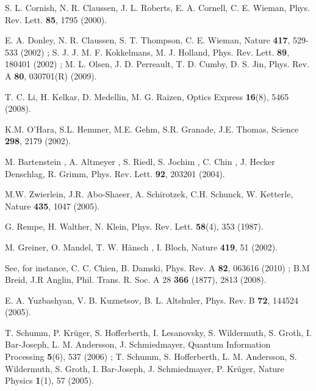 \documentclass[aps,pra,floats,epsfig,pdflatex]{revtex4}                                                              %
\begin{document}
\begin{thebibliography}{}
S. L. Cornish, N. R. Claussen, J. L. Roberts, E. A. Cornell, C. E. Wieman, Phys. Rev. Lett. \textbf{85}, 1795 (2000).

E. A. Donley, N. R. Claussen, S. T. Thompson, C. E. Wieman, {Nature} \textbf{417}, 529-533 (2002) ; 
S. J. J. M. F. Kokkelmans, M. J. Holland, {Phys. Rev. Lett.} \textbf{89}, 180401 (2002) ; M. L. Olsen, J. D. Perreault, T. D. Cumby, D. S. Jin, {Phys. Rev. A} \textbf{80}, 030701(R) (2009).

T. C. Li, H. Kelkar, D. Medellin, M. G. Raizen, Optics Express \textbf{16}(8), 5465 (2008).

K.M. O'Hara, S.L. Hemmer, M.E. Gehm, S.R. Granade, J.E. Thomas, {Science} {\bf 298}, 2179 (2002).

M. Bartenstein , A. Altmeyer , S. Riedl, S. Jochim , C. Chin , J. Hecker Denschlag, R. Grimm, {Phys. Rev. Lett.} {\bf 92}, 203201 (2004).

M.W. Zwierlein, J.R. Abo-Shaeer, A. Schirotzek, C.H. Schunck, W. Ketterle, {Nature} {\bf 435}, 1047 (2005).

G. Rempe, H. Walther, N. Klein, Phys. Rev. Lett. \textbf{58}(4), 353 (1987).

M. Greiner, O. Mandel, T. W. H\"ansch , I. Bloch, Nature \textbf{419}, 51 (2002).

See, for instance,  C. C. Chien, B. Damski, Phys. Rev. A \textbf{82}, 063616 (2010) ; B.M Breid, J.R Anglin,  Phil. Trans. R. Soc. A 28 \textbf{366} (1877), 2813 (2008).

E. A. Yuzbashyan, V. B. Kuznetsov, B. L. Altshuler, {Phys. Rev. B} \textbf{72}, 144524 (2005).

T. Schumm, P. Kr\"uger, S. Hofferberth, I. Lesanovsky, S. Wildermuth, S. Groth, I. Bar-Joseph, L. M. Andersson, J. Schmiedmayer,  Quantum Information Processing \textbf{5}(6), 537 (2006) ;  T. Schumm, S. Hofferberth, L. M. Andersson, S. Wildermuth, S. Groth, I. Bar-Joseph, J. Schmiedmayer, P. Kr\"uger, Nature Physics \textbf{1}(1), 57 (2005).

\end{thebibliography}
\end{document}

